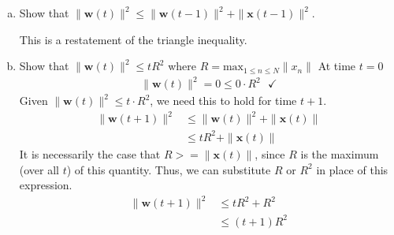 \documentclass[10pt]{article}
\newcommand{\BF}[1]{\mathbf{#1}}
\newcommand{\RM}[1]{\mathrm{#1}}
\newenvironment{problem}[2][Problem]{\begin{trivlist}
\item[\hskip \labelsep {\bfseries #1}\hskip \labelsep {\bfseries #2.}]}{\end{trivlist}}
\begin{document}
\begin{problem}{1.3}
\begin{enumerate}[a)]
  \item Show that $\|\BF{w}(t)\|^2 \leq \|\BF{w}(t-1)\|^2 + \|\BF{x}(t-1)\|^2$.
    
    This is a restatement of the triangle inequality.
  \item Show that $\|\BF{w}(t)\|^2 \leq tR^2$ where $R = \RM{max}_{1 \leq n \leq N} \|x_n\|$
    At time $t=0$
    \begin{align*}
      \|\BF{w}(t)\|^2 = 0 \leq 0\cdot R^2~~~\checkmark
    \end{align*}
    Given $\|\BF{w}(t)\|^2 \leq t \cdot R^2$, we need this to hold for time $t + 1$.
    \begin{align*}
      \|\BF{w}(t + 1)\|^2
      &\leq \|\BF{w}(t)\|^2 + \|\BF{x}(t)\| \\
      &\leq tR^2 + \|\BF{x}(t)\|
    \end{align*}
    It is necessarily the case that $R >= \|\BF{x}(t)\|$, since $R$ is the maximum (over all $t$)
    of this quantity. Thus, we can substitute $R$ or $R^2$ in place of this expression.
    \begin{align*}
       \|\BF{w}(t + 1)\|^2
      &\leq tR^2 + R^2 \\
      &\leq (t + 1)R^2
    \end{align*}

  \end{enumerate}
\end{problem}
\end{document}

